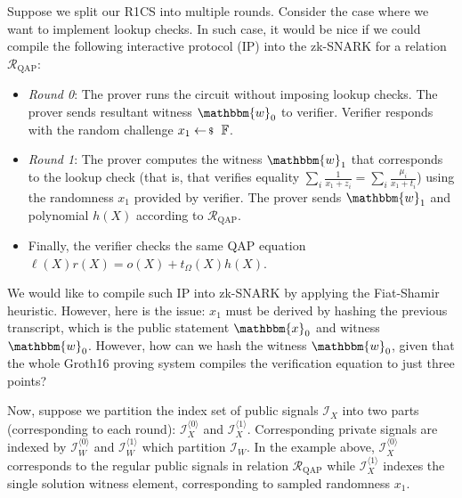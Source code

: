 \documentclass[../../book]{subfiles}
\begin{document}
Suppose we split our R1CS into multiple rounds. Consider the case where we want
to implement lookup checks. In such case, it would be nice if we could compile
the following interactive protocol (IP) into the zk-SNARK for a relation
$\mathcal{R}_{\text{QAP}}$:
\begin{itemize}
    \item \textit{Round 0}: The prover runs the circuit without imposing lookup
    checks. The prover sends resultant witness $\mathbbm{w}_0$ to verifier.
    Verifier responds with the random challenge $x_1 \leftarrowS \mathbb{F}$.
    \item \textit{Round 1}: The prover computes the witness $\mathbbm{w}_1$ that
    corresponds to the lookup check (that is, that verifies equality $\sum_{i}
    \frac{1}{x_1+z_i}=\sum_i \frac{\mu_i}{x_1+t_i}$) using the randomness $x_1$
    provided by verifier. The prover sends $\mathbbm{w}_1$ and polynomial $h(X)$
    according to $\mathcal{R}_{\text{QAP}}$.
    \item Finally, the verifier checks the same QAP equation
    $\ell(X)r(X)=o(X)+t_{\Omega}(X)h(X)$.
\end{itemize}

We would like to compile such IP into zk-SNARK by applying the Fiat-Shamir
heuristic. However, here is the issue: $x_1$ must be derived by hashing the
previous transcript, which is the public statement $\mathbbm{x}_0$ and witness
$\mathbbm{w}_0$. However, how can we hash the witness $\mathbbm{w}_0$, given that
the whole Groth16 proving system compiles the verification equation to just
three points?

Now, suppose we partition the index set of public signals $\mathcal{I}_X$ into
two parts (corresponding to each round): $\mathcal{I}_X^{\langle 0 \rangle}$ and
$\mathcal{I}_X^{\langle 1 \rangle}$. Corresponding private signals are indexed
by $\mathcal{I}_W^{\langle 0 \rangle}$ and $\mathcal{I}_W^{\langle 1 \rangle}$
which partition $\mathcal{I}_W$. In the example above, $\mathcal{I}_X^{\langle 0
\rangle}$ corresponds to the regular public signals in relation
$\mathcal{R}_{\text{QAP}}$ while $\mathcal{I}_X^{\langle 1 \rangle}$ indexes the
single solution witness element, corresponding to sampled randomness $x_1$.
\end{document}

